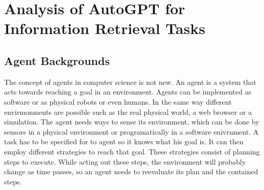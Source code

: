 \documentclass[english, version-2022-01]{uzl-thesis}
\begin{document}





\chapter{Analysis of AutoGPT for Information Retrieval Tasks}



\section{Agent Backgrounds}

The concept of agents in computer science is not new. An agent is a system that acts towards reaching a goal in an environment. Agents can be implemented as software or as physical robots or even humans. In the same way different envirmonments are possible such as the real physical world, a web browser or a simulation. The agent needs ways to sense its environment, which can be done by sensors in a physical environment or programatically in a software enivrnment. A task has to be specified for to agent so it knows what his goal is. It can then employ different strategies to reach that goal. These strategies consist of planning steps to execute. While acting out these steps, the environment will probably change as time passes, so an agent needs to reevaluate its plan and the contained steps.
\end{document}
